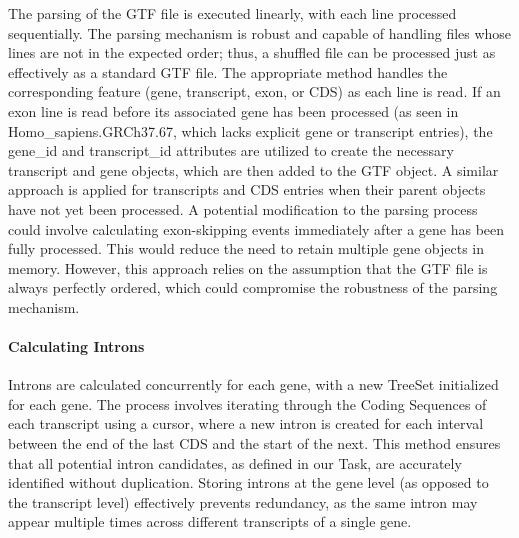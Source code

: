\documentclass{article}
\begin{document}
    The parsing of the GTF file is executed linearly, with each line processed sequentially. The parsing mechanism is robust and capable of handling files whose lines are not in the expected order; thus, a shuffled file can be processed just as effectively as a standard GTF file. The appropriate method handles the corresponding feature (gene, transcript, exon, or CDS) as each line is read. If an exon line is read before its associated gene has been processed (as seen in Homo\_sapiens.GRCh37.67, which lacks explicit gene or transcript entries), the gene\_id and transcript\_id attributes are utilized to create the necessary transcript and gene objects, which are then added to the GTF object. A similar approach is applied for transcripts and CDS entries when their parent objects have not yet been processed. A potential modification to the parsing process could involve calculating exon-skipping events immediately after a gene has been fully processed. This would reduce the need to retain multiple gene objects in memory. However, this approach relies on the assumption that the GTF file is always perfectly ordered, which could compromise the robustness of the parsing mechanism.

    \paragraph{Calculating Introns}
    Introns are calculated concurrently for each gene, with a new TreeSet initialized for each gene. The process involves iterating through the Coding Sequences of each transcript using a cursor, where a new intron is created for each interval between the end of the last CDS and the start of the next. This method ensures that all potential intron candidates, as defined in our Task, are accurately identified without duplication. Storing introns at the gene level (as opposed to the transcript level) effectively prevents redundancy, as the same intron may appear multiple times across different transcripts of a single gene.
\end{document}
